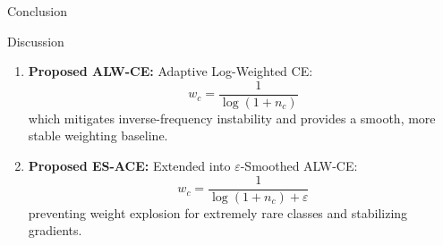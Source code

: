 \documentclass[aspectratio=169]{beamer}
\renewcommand{\textbf}[1]{\textcolor{SejongBlue}{\sf\bfseries #1}}
\begin{document}
\begin{frame}{Conclusion}
\small

\begin{mybox}{Discussion} %

\begin{enumerate}

\item \textbf{Proposed ALW-CE:}
Adaptive Log-Weighted CE:
\[
w_c = \frac{1}{\log(1+n_c)}
\]
which mitigates inverse-frequency instability and provides
a smooth, more stable weighting baseline.

\vspace{0.4em}

\item \textbf{Proposed ES-ACE:}
Extended into $\varepsilon$-Smoothed ALW-CE:
\[
w_c = \frac{1}{\log(1+n_c) + \varepsilon}
\]
preventing weight explosion for extremely rare classes
and stabilizing gradients.

\end{enumerate}

\end{mybox}

\end{frame}
\end{document}
